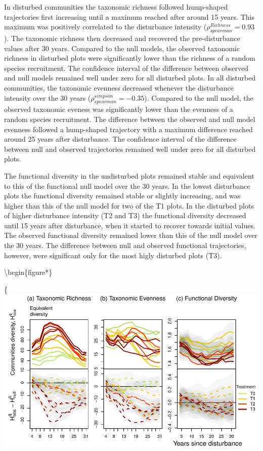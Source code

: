 \documentclass[fleqn,10pt]{ArtEcoFoG} %
\begin{document}
In disturbed communities the taxonomic richness followed hump-shaped
trajectories first increasing until a maximum reached after around 15
years. This maximum was positively correlated to the disturbance
intensity (\(\rho^{Richness}_{spearman}=0.93\)). The taxonomic richness
then decreased and recovered the pre-disturbance values after 30 years.
Compared to the null models, the observed taxonomic richness in
disturbed plots were significantly lower than the richness of a random
species recruitment. The confidence interval of the difference between
observed and null models remained well under zero for all disturbed
plots. In all disturbed communities, the taxonomic evenness decreased
whenever the disturbance intensity over the 30 years
(\(\rho^{simpson}_{spearman}=-0.35\)). Compared to the null model, the
observed taxonomic eveness was significantly lower than the evenness of
a random species recruitment. The difference between the observed and
null model evenness followed a hump-shaped trajectory with a maximum
difference reached around 25 years after disturbance. \color{red} The
confidence interval of the difference between null and observed
trajectories remained well under zero for all disturbed plots.
\color{black}

The functional diversity in the undisturbed plots remained stable and
equivalent to this of the functional null model over the 30 years. In
the lowest disturbance plots the functional diversity remained stable or
slightly increasing, and was higher than this of the null model for two
of the T1 plots. In the disturbed plots of higher disturbance intensity
(T2 and T3) the functional diversity decreased until 15 years after
disturbance, when it started to recover towards initial values. The
observed functional diversity remained lower than this of the null model
over the 30 years. \color{red} The difference between null and observed
functional trajectories, however, were significant only for the most
higly disturbed plots (T3). \color{black}

\textbackslash{}begin\{figure*\}

\{\centering \includegraphics{RecruitmentTrajectories_files/figure-latex/DivTraj-1}
\end{document}
